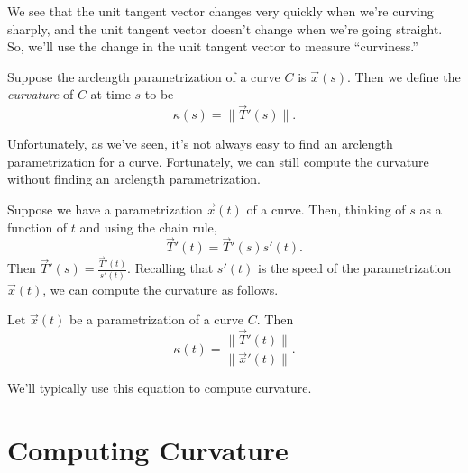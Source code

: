 \documentclass{ximera}
\begin{document}

We see that the unit tangent vector changes very quickly when we're curving sharply, and the unit tangent vector doesn't change when we're going straight. So, we'll use the change in the unit tangent vector to measure ``curviness.''

\begin{definition}
Suppose the arclength parametrization of a curve $C$ is $\vec{x}(s)$. Then we define the \emph{curvature} of $C$ at time $s$ to be
\[
\kappa(s) = \|\vec{T}'(s)\|.
\]
\end{definition}

Unfortunately, as we've seen, it's not always easy to find an arclength parametrization for a curve. Fortunately, we can still compute the curvature without finding an arclength parametrization.

Suppose we have a parametrization $\vec{x}(t)$ of a curve. Then, thinking of $s$ as a function of $t$ and using the chain rule,
\[
\vec{T}'(t) = \vec{T}'(s)s'(t).
\]
Then $\vec{T}'(s) = \frac{\vec{T}'(t)}{s'(t)}$. Recalling that $s'(t)$ is the speed of the parametrization $\vec{x}(t)$, we can compute the curvature as follows.

\begin{proposition}
Let $\vec{x}(t)$ be a parametrization of a curve $C$. Then
\[
\kappa(t) = \frac{\|\vec{T}'(t)\|}{\|\vec{x}'(t)\|}.
\]
\end{proposition}

We'll typically use this equation to compute curvature.

\section*{Computing Curvature}
\end{document}
